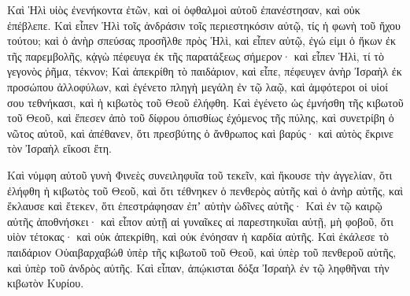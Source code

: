 {Καὶ Ἡλὶ υἱὸς ἐνενήκοντα ἐτῶν, καὶ οἱ ὀφθαλμοὶ αὐτοῦ ἐπανέστησαν, καὶ οὐκ ἐπέβλεπε. Καὶ εἶπεν Ἡλὶ τοῖς ἀνδράσιν τοῖς περιεστηκόσιν αὐτῷ, τίς ἡ φωνὴ τοῦ ἤχου τούτου;
καὶ ὁ ἀνὴρ σπεύσας προσῆλθε πρὸς Ἡλὶ, καὶ εἶπεν αὐτῷ, ἐγώ εἰμι ὁ ἥκων ἐκ τῆς παρεμβολῆς, κᾀγὼ πέφευγα ἐκ τῆς παρατάξεως σήμερον· καὶ εἶπεν Ἡλὶ, τί τὸ γεγονὸς ῥῆμα, τέκνον;
Καὶ ἀπεκρίθη τὸ παιδάριον, καὶ εἶπε, πέφευγεν ἀνὴρ Ἰσραὴλ ἐκ προσώπου ἀλλοφύλων, καὶ ἐγένετο πληγὴ μεγάλη ἐν τῷ λαῷ, καὶ ἀμφότεροι οἱ υἱοί σου τεθνήκασι, καὶ ἡ κιβωτὸς τοῦ Θεοῦ ἐλήφθη.
Καὶ ἐγένετο ὡς ἐμνήσθη τῆς κιβωτοῦ τοῦ Θεοῦ, καὶ ἔπεσεν ἀπὸ τοῦ δίφρου ὀπισθίως ἐχόμενος τῆς πύλης, καὶ συνετρίβη ὁ νῶτος αὐτοῦ, καὶ ἀπέθανεν, ὅτι πρεσβύτης ὁ ἄνθρωπος καὶ βαρύς· καὶ αὐτὸς ἔκρινε τὸν Ἰσραὴλ εἴκοσι ἔτη.
\par }{\PP {}Καὶ νύμφη αὐτοῦ γυνὴ Φινεὲς συνειληφυῖα τοῦ τεκεῖν, καὶ ἤκουσε τὴν ἀγγελίαν, ὅτι ἐλήφθη ἡ κιβωτὸς τοῦ Θεοῦ, καὶ ὅτι τέθνηκεν ὁ πενθερὸς αὐτῆς καὶ ὁ ἀνὴρ αὐτῆς, καὶ ἔκλαυσε καὶ ἔτεκεν, ὅτι ἐπεστράφησαν ἐπʼ αὐτὴν ὠδῖνες αὐτῆς·
Καὶ ἐν τῷ καιρῷ αὐτῆς ἀποθνήσκει· καὶ εἶπον αὐτῇ αἱ γυναῖκες αἱ παρεστηκυῖαι αὐτῇ, μὴ φοβοῦ, ὅτι υἱὸν τέτοκας· καὶ οὐκ ἀπεκρίθη, καὶ οὐκ ἐνόησαν ἡ καρδία αὐτῆς.
Καὶ ἐκάλεσε τὸ παιδάριον Οὐαιβαρχαβώθ ὑπὲρ τῆς κιβωτοῦ τοῦ Θεοῦ, καὶ ὑπὲρ τοῦ πενθεροῦ αὐτῆς, καὶ ὑπὲρ τοῦ ἀνδρὸς αὐτῆς.
Καὶ εἶπαν, ἀπῴκισται δόξα Ἰσραὴλ ἐν τῷ ληφθῆναι τὴν κιβωτὸν Κυρίου.

}
